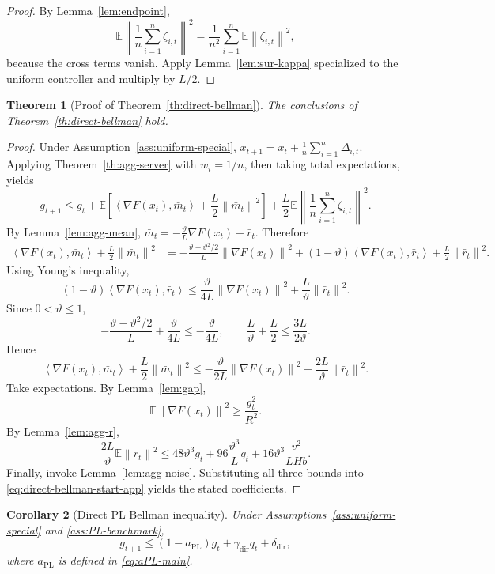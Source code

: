 \documentclass{article}
\newtheorem{theorem}{Theorem}[section]
\newtheorem{corollary}[theorem]{Corollary}
\theoremstyle{definition}
\newcommand{\EE}{\mathbb E}
\newcommand{\norm}[1]{\left\lVert #1\right\rVert}
\newcommand{\ip}[2]{\left\langle #1,#2\right\rangle}
\begin{document}
\begin{proof}
By Lemma~\ref{lem:endpoint},
\[
\EE\left\|\frac1n\sum_{i=1}^n \zeta_{i,t}\right\|^2
=
\frac1{n^2}\sum_{i=1}^n \EE\norm{\zeta_{i,t}}^2,
\]
because the cross terms vanish. Apply Lemma~\ref{lem:sur-kappa} specialized to
the uniform controller and multiply by $L/2$.
\end{proof}

\begin{theorem}[Proof of Theorem~\ref{th:direct-bellman}]
\label{th:direct-bellman-proof}
The conclusions of Theorem~\ref{th:direct-bellman} hold.
\end{theorem}

\begin{proof}
Under Assumption~\ref{ass:uniform-special},
$x_{t+1}=x_t+\frac1n\sum_{i=1}^n \Delta_{i,t}$.
Applying Theorem~\ref{th:agg-server} with $w_i=1/n$, then taking total
expectations, yields
\begin{equation}
g_{t+1}
\le
g_t
+
\EE\!\left[
\ip{\nabla F(x_t)}{\bar m_t}
+
\frac{L}{2}\norm{\bar m_t}^2
\right]
+
\frac{L}{2}\EE\!\left\|
\frac1n\sum_{i=1}^n \zeta_{i,t}
\right\|^2.
\label{eq:direct-bellman-start-app}\end{equation}
By Lemma~\ref{lem:agg-mean}, $
\bar m_t=-\frac{\vartheta}{L}\nabla F(x_t)+\bar r_t$.
Therefore
\begin{align*}
\ip{\nabla F(x_t)}{\bar m_t}+\frac{L}{2}\norm{\bar m_t}^2
&=
-\frac{\vartheta-\vartheta^2/2}{L}\norm{\nabla F(x_t)}^2
+
(1-\vartheta)\ip{\nabla F(x_t)}{\bar r_t}
+
\frac{L}{2}\norm{\bar r_t}^2.
\end{align*}
Using Young's inequality,
\[
(1-\vartheta)\ip{\nabla F(x_t)}{\bar r_t}
\le
\frac{\vartheta}{4L}\norm{\nabla F(x_t)}^2
+
\frac{L}{\vartheta}\norm{\bar r_t}^2.
\]
Since $0<\vartheta\le 1$,
\[
-\frac{\vartheta-\vartheta^2/2}{L}+\frac{\vartheta}{4L}\le -\frac{\vartheta}{4L},
\qquad
\frac{L}{\vartheta}+\frac{L}{2}\le \frac{3L}{2\vartheta}.
\]
Hence
\[
\ip{\nabla F(x_t)}{\bar m_t}+\frac{L}{2}\norm{\bar m_t}^2
\le
-\frac{\vartheta}{2L}\norm{\nabla F(x_t)}^2
+
\frac{2L}{\vartheta}\norm{\bar r_t}^2.
\]
Take expectations. By Lemma~\ref{lem:gap},
\[
\EE\norm{\nabla F(x_t)}^2\ge \frac{g_t^2}{R^2}.
\]
By Lemma~\ref{lem:agg-r},
\[
\frac{2L}{\vartheta}\EE\norm{\bar r_t}^2
\le
48\vartheta^3 g_t
+
96\frac{\vartheta^3}{L}q_t
+
16\vartheta^3\frac{v^2}{L H b}.
\]
Finally, invoke Lemma~\ref{lem:agg-noise}. Substituting all three bounds into
\eqref{eq:direct-bellman-start-app} yields the stated coefficients.
\end{proof}
\begin{corollary}[Direct PL Bellman inequality]
\label{cor:direct-pl}
Under Assumptions~\ref{ass:uniform-special} and \ref{ass:PL-benchmark},
\[
g_{t+1}
\le
(1-a_{\mathrm{PL}})g_t
+
\gamma_{\mathrm{dir}}q_t
+
\delta_{\mathrm{dir}},
\]
where $a_{\mathrm{PL}}$ is defined in \eqref{eq:aPL-main}.
\end{corollary}
\end{document}
